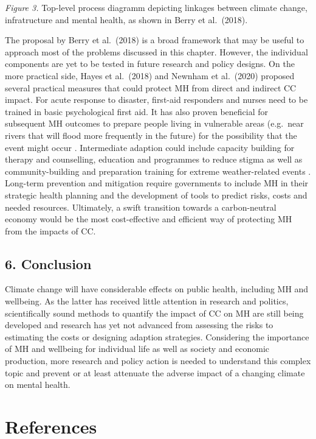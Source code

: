 \documentclass[
]{krantz}
\begin{document}
\emph{Figure 3.} Top-level process diagramm depicting linkages between climate change, infratructure and mental health, as shown in Berry et al.~(2018).

The proposal by Berry et al.~(2018) is a broad framework that may be useful to approach most of the problems discussed in this chapter. However, the individual components are yet to be tested in future research and policy designs.
On the more practical side, Hayes et al.~(2018) and Newnham et al.~(2020) proposed several practical measures that could protect MH from direct and indirect CC impact. For acute response to disaster, first-aid responders and nurses need to be trained in basic psychological first aid. It has also proven beneficial for subsequent MH outcomes to prepare people living in vulnerable areas (e.g.~near rivers that will flood more frequently in the future) for the possibility that the event might occur \citep{munroEffectEvacuationDisplacement2017}. Intermediate adaption could include capacity building for therapy and counselling, education and programmes to reduce stigma as well as community-building and preparation training for extreme weather-related events \citep{newnhamPreparingMentalHealth2020}. Long-term prevention and mitigation require governments to include MH in their strategic health planning and the development of tools to predict risks, costs and needed resources. Ultimately, a swift transition towards a carbon-neutral economy would be the most cost-effective and efficient way of protecting MH from the impacts of CC.

\section{6. Conclusion}\label{conclusion-6}

Climate change will have considerable effects on public health, including MH and wellbeing. As the latter has received little attention in research and politics, scientifically sound methods to quantify the impact of CC on MH are still being developed and research has yet not advanced from assessing the risks to estimating the costs or designing adaption strategies. Considering the importance of MH and wellbeing for individual life as well as society and economic production, more research and policy action is needed to understand this complex topic and prevent or at least attenuate the adverse impact of a changing climate on mental health.

\newpage

\chapter{References}\label{references}
\end{document}
